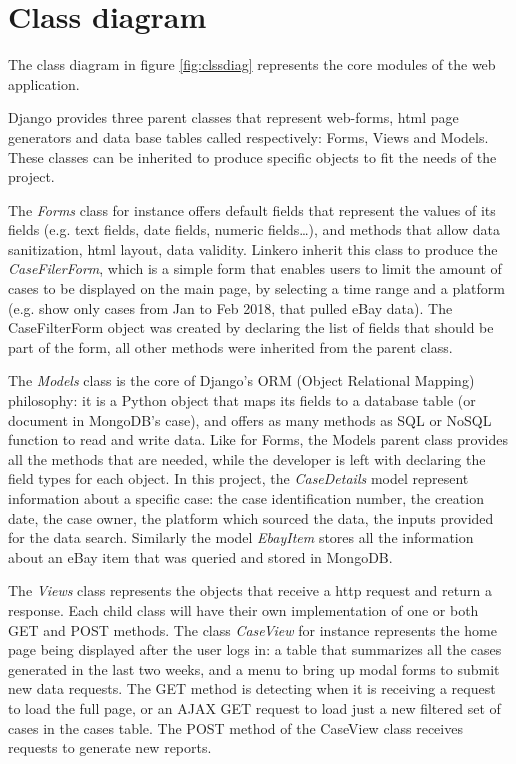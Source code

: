 \section{Class diagram}
The class diagram in figure \ref{fig:clssdiag} represents the core modules of
the web application.

Django provides three parent classes that represent web-forms, html page
generators and data base tables called respectively: Forms, Views and Models.
These classes can be inherited to produce specific objects to fit the needs of
the project.

The \emph{Forms} class for instance offers default fields that represent the
values of its fields (e.g. text fields, date fields, numeric fields\ldots), and methods
that allow data sanitization, html layout, data validity. Linkero inherit this
class to produce the \emph{CaseFilerForm}, which is a simple form that enables
users to limit the amount of cases to be displayed on the main page, by
selecting a time range and a platform (e.g. show only cases from Jan to Feb
2018, that pulled eBay data). The CaseFilterForm object was created by declaring
the list of fields that should be part of the form, all other methods were
inherited from the parent class.

The \emph{Models} class is the core of Django's ORM (Object Relational Mapping)
philosophy: it is a Python object that maps its fields to a database table (or
document in MongoDB's case), and offers as many methods as SQL or NoSQL function
to read and write data. Like for Forms, the Models parent class provides all the
methods that are needed, while the developer is left with declaring the field
types for each object. In this project, the \emph{CaseDetails} model represent
information about a specific case: the case identification number, the creation
date, the case owner, the platform which sourced the data, the inputs provided
for the data search. Similarly the model \emph{EbayItem} stores all the
information about an eBay item that was queried and stored in MongoDB.

The \emph{Views} class represents the objects that receive a http request and
return a response. Each child class will have their own implementation of one or
both GET and POST methods. The class \emph{CaseView} for instance represents the
home page being displayed after the user logs in: a table that summarizes all
the cases generated in the last two weeks, and a menu to bring up modal forms to
submit new data requests. The GET method is detecting when it is receiving a
request to load the full page, or an AJAX GET request to load just a new
filtered set of cases in the cases table. The POST method of the CaseView class
receives requests to generate new reports.

